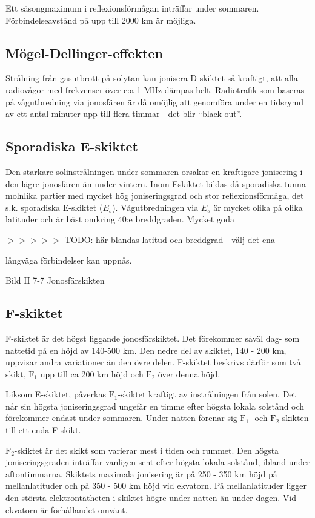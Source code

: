 Ett säsongmaximum i reflexionsförmågan inträffar under
sommaren. Förbindelseavstånd på upp till 2000 km är möjliga.

\subsection{Mögel-Dellinger-effekten}

Strålning från gasutbrott på solytan kan jonisera D-skiktet så
kraftigt, att alla radiovågor med frekvenser över c:a 1 MHz dämpas
helt.  Radiotrafik som baseras på vågutbredning via jonosfären är då
omöjlig att genomföra under en tidsrymd av ett antal minuter upp till
flera timmar - det blir ``black out''.

\subsection{Sporadiska E-skiktet}

Den starkare solinstrålningen under sommaren orsakar en kraftigare
jonisering i den lägre jonosfären än under vintern. Inom Eskiktet
bildas då sporadiska tunna molnlika partier med mycket hög
joniseringsgrad och stor reflexionsförmåga, det s.k. sporadiska
E-skiktet (\(E_s\)). Vågutbredningen via \(E_s\) är mycket olika på
olika latituder och är bäst omkring 40:e breddgraden. Mycket goda

$>>>>>$ TODO: här blandas latitud och breddgrad - välj det ena

långväga förbindelser kan uppnås.

Bild II 7-7 Jonosfärskikten

\subsection{F-skiktet}

F-skiktet är det högst liggande jonosfärskiktet. Det förekommer såväl
dag- som nattetid på en höjd av 140-500 km. Den nedre del av skiktet,
140 - 200 km, uppvisar andra variationer än den övre delen. F-skiktet
beskrivs därför som två skikt, \(\mathrm{F_1}\) upp till ca 200 km
höjd och \(\mathrm{F_2}\) över denna höjd.

Liksom E-skiktet, påverkas \(\mathrm{F_1}\)-skiktet kraftigt av
instrålningen från solen. Det når sin högsta joniseringsgrad ungefär
en timme efter högsta lokala solstånd och förekommer endast under
sommaren. Under natten förenar sig \(\mathrm{F_1}\)- och
\(\mathrm{F_2}\)-skikten till ett enda F-skikt.

\(\mathrm{F_2}\)-skiktet är det skikt som varierar mest i tiden och
rummet. Den högsta joniseringsgraden inträffar vanligen sent efter
högsta lokala solstånd, ibland under aftontimmarna.  Skiktets maximala
jonisering är på 250 - 350 km höjd på mellanlatituder och på 350 - 500
km höjd vid ekvatorn. På mellanlatituder ligger den största
elektrontätheten i skiktet högre under natten än under dagen. Vid
ekvatorn är förhållandet omvänt.

